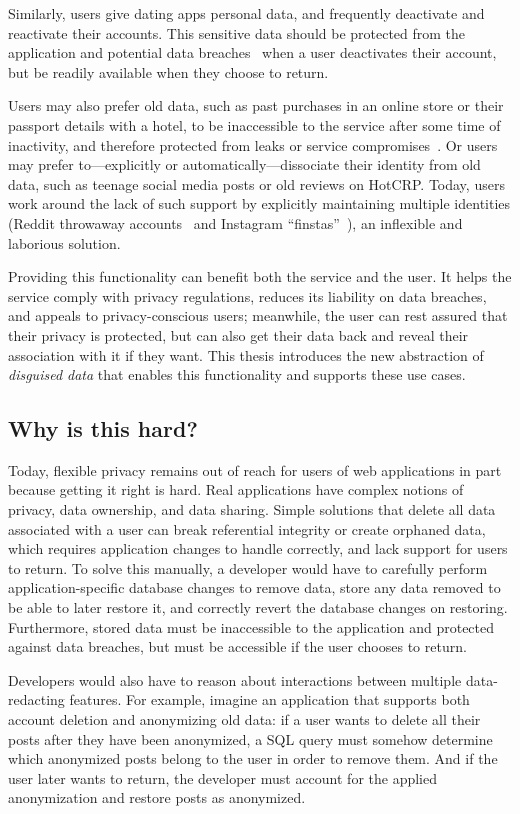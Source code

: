 Similarly, users give dating apps personal data, and frequently deactivate and
reactivate their accounts.
%
This sensitive data should be protected from the application and potential data
breaches~\cite{tinder, okcupid} when a user deactivates their account, but be
readily available when they choose to return.

Users may also prefer old data, such as past purchases in an online store or
their passport details with a hotel, to be inaccessible to the service after
some time of inactivity, and therefore protected from leaks or service
compromises~\cite{retention,breach:marriott}. Or users may prefer
to---explicitly or automatically---dissociate their identity from old data, such
as teenage social media posts or old reviews on HotCRP.
%
Today, users work around the lack of such support by explicitly maintaining
multiple identities (\eg Reddit throwaway
accounts~\cite{reddit:throwaway} and Instagram
``finstas''~\cite{nytimes:finsta}), an inflexible and laborious solution.
%

%
Providing this functionality can benefit both the service and the user.
%
It helps the service comply with privacy regulations, reduces its liability on
data breaches, and appeals to privacy-conscious users; meanwhile, the user can
rest assured that their privacy is protected, but can also get their data back
and reveal their association with it if they want.
%
This thesis introduces the new abstraction of \emph{disguised data} that
enables this functionality and supports these use cases. 

\subsection{Why is this hard?} 
Today, flexible privacy remains out of reach for users of
web applications in part because getting it right is hard. 
%
Real applications have complex notions of privacy, data ownership, and data
sharing.
%
Simple solutions that \eg delete all data associated with a user can break
referential integrity or create orphaned data, which requires application
changes to handle correctly, and lack support for users to return.
%
To solve this manually, a developer would have to carefully perform
application-specific database changes to remove data, store any data removed to
be able to later restore it, and correctly revert the database changes on
restoring.
%
Furthermore, stored data must be inaccessible to the application and protected
against data breaches, but must be accessible if the user chooses to return.
%

Developers would also have to reason about interactions between multiple
data-redacting features.
%
For example, imagine an application that supports both account deletion and
anonymizing old data: if a user wants to delete all their posts after they have
been anonymized, a SQL query must somehow determine which anonymized posts
belong to the user in order to remove them.
%
And if the user later wants to return, the developer must account for the
applied anonymization and restore posts as anonymized.
%
